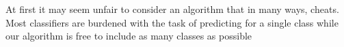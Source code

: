 At first it may seem unfair to consider an algorithm that in many ways, cheats. Most classifiers are burdened with the task of predicting for a single class while our algorithm is free to include as many classes as possible 

